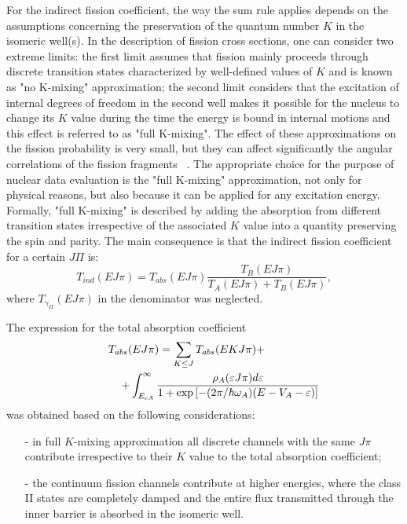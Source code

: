 For the indirect fission coefficient, the way the sum rule applies depends
on the assumptions concerning the preservation of the quantum number $K$ in
the isomeric well(s). In the description of fission cross sections, one can
consider two extreme limits: the first limit assumes that fission mainly
proceeds through discrete transition states characterized by well-defined
values of $K$ and is known as "no K-mixing" approximation; the second limit
considers that the excitation of internal degrees of freedom in the second
well makes it possible for the nucleus to change its $K$ value during the
time the energy is bound in internal motions and this effect is referred to
as "full K-mixing". The effect of these approximations on the fission
probability is very small, but they can affect significantly the angular
correlations of the fission fragments ~\cite{Back:74}. The appropriate
choice for the purpose of nuclear data evaluation is the "full K-mixing"
approximation, not only for physical reasons, but also because it can be
applied for any excitation energy. Formally, "full K-mixing" is described by
adding the absorption from different transition states irrespective of the
associated $K$ value into a quantity preserving the spin and parity. The
main consequence is that the indirect fission coefficient for a certain $%
J\Pi $ is:
\begin{equation}
T_{ind}(E J \pi)=T_{abs}(E J \pi)\frac{T_{B}(E J \pi)}{T_{A}(E J
\pi)+T_{B}(E J \pi)},  \label{tind1}
\end{equation}
where $T_{\gamma_{II}}(E J \pi)$ in the denominator was neglected.

The expression for the total absorption coefficient
\begin{eqnarray}
T_{abs}(EJ\pi)=\sum_{K\le J}T_{abs}(EKJ\pi) +\qquad\qquad\quad  \notag \\
\quad\qquad + \int_{E_{cA}}^{\infty} \frac {\rho_{A}(\varepsilon
J\pi)d\varepsilon} {1+\exp\left[ -(2\pi/\hbar\omega_{A})
(E-V_{A}-\varepsilon)\right] }  \label{tabst}
\end{eqnarray}
was obtained based on the following considerations:

\begin{itemize}
\item[-] in full $K$-mixing approximation all  discrete channels with the
same $J\pi$ contribute irrespective to their $K$ value to the total
absorption coefficient;

\item[-] the continuum fission channels contribute at higher energies, where
the class II states are completely damped and the entire flux transmitted
through the inner barrier is absorbed in the isomeric well.
\end{itemize}

